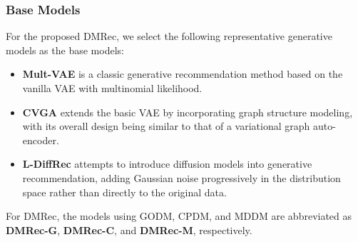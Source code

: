 \documentclass[sigconf]{acmart}
\begin{document}
\subsubsection{\textbf{Base Models}}
\label{base_model}
For the proposed \textsf{DMRec}, we select the following representative generative models as the base models:
\begin{itemize}[leftmargin=*]
    \item \textbf{Mult-VAE} \cite{liang2018variational} is a classic generative recommendation method based on the vanilla VAE with multinomial likelihood.
    \item \textbf{CVGA} \cite{zhang2023revisiting} extends the basic VAE by incorporating graph structure modeling, with its overall design being similar to that of a variational graph auto-encoder.
    \item \textbf{L-DiffRec} \cite{wang2023diffusion} attempts to introduce diffusion models into generative recommendation, adding Gaussian noise progressively in the distribution space rather than directly to the original data.
\end{itemize}
For \textsf{DMRec}, the models using GODM, CPDM, and MDDM are abbreviated as \textbf{\textsf{DMRec-G}}, \textbf{\textsf{DMRec-C}}, and \textbf{\textsf{DMRec-M}}, respectively.
\end{document}
